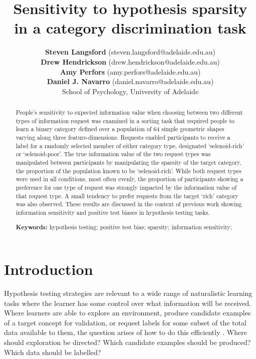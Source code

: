 \documentclass[10pt,letterpaper]{article}
\title{Sensitivity to hypothesis sparsity in a category discrimination task}
\author{{\bf Steven Langsford} (steven.langsford@adelaide.edu.au) \\
   	{\bf Drew Hendrickson} (drew.hendrickson@adelaide.edu.au) \\
	{\bf Amy Perfors} (amy.perfors@adelaide.edu.au) \\
   	{\bf Daniel J. Navarro} (daniel.navarro@adelaide.edu.au) \\
   School of Psychology, University of Adelaide}
\begin{document}
\maketitle

\begin{abstract}
People's sensitivity to expected information value when choosing between two different types of information request was examined in a sorting task that required people to learn a binary category defined over a population of 64 simple geometric shapes varying along three feature-dimensions. Requests enabled participants to receive a label for a randomly selected member of either category type, designated `selenoid-rich' or `selenoid-poor'. The true information value of the two request types was manipulated between participants by manipulating the sparsity of the target category, the proportion of the population known to be `selenoid-rich'. While both request types were used in all conditions, most often evenly, the proportion of participants showing a preference for one type of request was strongly impacted by the information value of that request type. A small tendency to prefer requests from the target `rich' category was also observed. These results are discussed in the context of previous work showing information sensitivity and positive test biases in hypothesis testing tasks.

\textbf{Keywords:} 
hypothesis testing; positive test bias; sparsity; information sensitivity;
\end{abstract}


\section*{Introduction}
Hypothesis testing strategies are relevant to a wide range of naturalistic learning tasks where the learner has some control over what information will be received. Where learners are able to explore an environment, produce candidate examples of a target concept for validation, or request labels for some subset of the total data available to them, the question arises of how to do this efficiently \cite{settles09activelearnlitrev,gureckis2012selfdirectedlearning}. Where should exploration be directed? Which candidate examples should be produced? Which data should be labelled?
\end{document}
